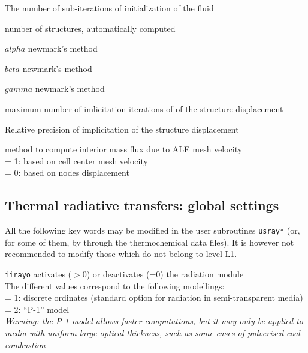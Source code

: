 {The number of sub-iterations of initialization of the fluid}

{number of structures, automatically computed}

{$alpha$ newmark's method}

{$beta$ newmark's method}

{$gamma$ newmark's method}

{maximum number of imlicitation iterations of of the structure displacement}

{Relative precision of implicitation of the structure displacement }

{method to compute interior mass flux due to ALE mesh velocity\\
\hspace*{1.3cm} = 1: based on cell center mesh velocity\\
\hspace*{1.3cm} = 0: based on nodes displacement
}
\subsection{Thermal radiative transfers: global settings}

All the following key words may be modified in the user subroutines
\texttt{usray*} (or, for some of them, by through the thermochemical data files).
It is however not recommended to modify those which do not belong to
level L1.

{{\tt iirayo} activates ($>0$) or deactivates
(=0) the radiation module\\
The different values correspond to the following modellings:\\
\hspace*{1.3cm} = 1: discrete ordinates
(standard option for radiation in semi-transparent media)\\
\hspace*{1.3cm} = 2: ``P-1'' model\\
{\em Warning: the P-1 model allows faster computations, but it
may only be applied to media with uniform large optical thickness, such as
some cases of pulverised coal combustion}}

